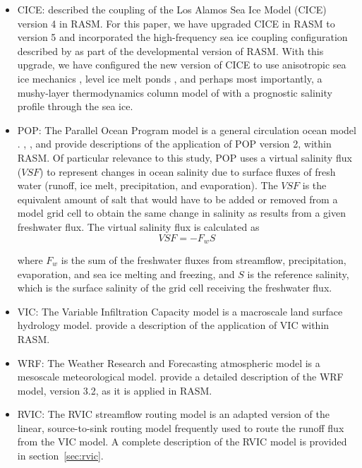 \begin{itemize}
\item CICE: \citet{Roberts_2015a} described the coupling of the Los Alamos Sea Ice Model (CICE) version 4 in RASM.
For this paper, we have upgraded CICE in RASM to version 5 \citep{Hunke2015} and incorporated the high-frequency sea ice coupling configuration described by \citet{Roberts_2015a} as part of the developmental version of RASM.
With this upgrade, we have configured the new version of CICE to use anisotropic sea ice mechanics \citep{Tsamados2013}, level ice melt ponds \citep{Hunke2013}, and perhaps most importantly, a mushy-layer thermodynamics column model of \citet{Turner2015} with a prognostic salinity profile through the sea ice.
\item POP: The Parallel Ocean Program model is a general circulation ocean model \citep{Smith_2010}.
\citet{Maslowski_2012}, \citet{Roberts_2015a}, and \citet{Osinski_2016} provide descriptions of the application of POP version 2, within RASM.
Of particular relevance to this study, POP uses a virtual salinity flux ($VSF$) to represent changes in ocean salinity due to surface fluxes of fresh water (runoff, ice melt, precipitation, and evaporation).
The $VSF$ is the equivalent amount of salt that would have to be added or removed from a model grid cell to obtain the same change in salinity as results from a given freshwater flux.
The virtual salinity flux is calculated as
\begin{equation}
  \label{eq:SaltFlux}
  VSF=-F_w S
\end{equation}

where $F_w$ is the sum of the freshwater fluxes from streamflow, precipitation, evaporation, and sea ice melting and freezing, and $S$ is the reference salinity, which is the surface salinity of the grid cell receiving the freshwater flux.

\item VIC: The Variable Infiltration Capacity model \citep{Liang_1994} is a macroscale land surface hydrology model.
\citet{Hamman_2016a} provide a description of the application of VIC within RASM.
\item WRF: The Weather Research and Forecasting atmospheric model \citep{Skamarock_2007} is a mesoscale meteorological model.
\citet{Cassano_2016} provide a detailed description of the WRF model, version 3.2, as it is applied in RASM.
\item RVIC: The RVIC streamflow routing model is an adapted version of the \citet{Lohmann_1996} linear, source-to-sink routing model frequently used to route the runoff flux from the VIC model.
A complete description of the RVIC model is provided in section~\ref{sec:rvic}.
\end{itemize}

